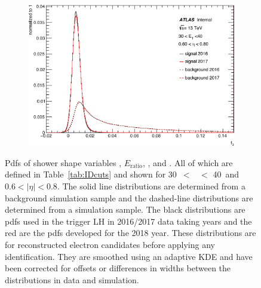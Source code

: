 \begin{figure}[t]
\begin{subfigure}[b]{0.49\textwidth}
    \label{fig:egamma:trig_f1}
  \end{subfigure}
  \hfill
  \begin{subfigure}[b]{0.49\textwidth}
    \centering
    \includegraphics[width=1.0\textwidth]{figs/egamma/trig_f3_highet.png} 
    \label{fig:egamma:trig_f3}
  \end{subfigure}
  \caption[Pdfs of shower shape variables \rphi, $E_{\mathrm{ratio}}$, \fI, and \fIII]{Pdfs of shower shape variables \rphi, $E_{\mathrm{ratio}}$, \fI, and \fIII.
  All of which are defined in Table~\ref{tab:IDcuts} and shown for
  30~\GeV $<$ \et\ $<$ 40~\GeV and $0.6<|\eta|<0.8$.
  The solid line distributions are determined from a background simulation sample and the dashed-line distributions are determined from a \Zee simulation sample.
  The black distributions are pdfs used in the trigger LH in 2016/2017 data taking years and the red are the pdfs developed for the 2018 year.
  These distributions are for reconstructed electron candidates before applying any identification.
  They are smoothed using an adaptive KDE and have been corrected for offsets or differences in widths between the distributions in data and simulation.
}
\label{fig:egamma:trig_pdfs_highet}
\end{figure}

